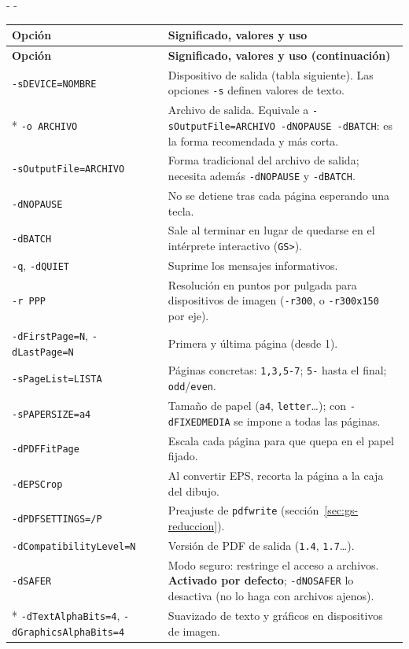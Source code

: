 \documentclass[11pt,a4paper]{article}
\makeatletter
\newcommand{\necesitaespacio}[1]{\par\penalty-100\begingroup
	\setlength{\dimen@}{#1}\dimen@ii\pagegoal\advance\dimen@ii-\pagetotal
	\ifdim\dimen@>\dimen@ii\ifdim\dimen@ii>\z@\vfil\fi\penalty-\@M\fi\endgroup}
\newenvironment{opciones}[1][Opción]{%
	\par\begingroup\small
	\begin{longtable}{L{4.25cm}L{11.2cm}}
		\toprule\rowcolor{tablacab}\cab{#1} & \cab{Significado, valores y uso} \\ \midrule
		\endfirsthead
		\toprule\rowcolor{tablacab}\cab{#1} & \cab{Significado, valores y uso (continuación)} \\ \midrule
		\endhead
		\bottomrule
		\endfoot}
	{\end{longtable}\endgroup}
\newcommand{\opt}[1]{\texttt{\textcolor{colopt}{#1}}}      %
\newcommand{\val}[1]{\texttt{#1}}                          %
\newcommand{\cab}[1]{\textbf{#1}}
\makeatother
\begin{document}
	\necesitaespacio{10\baselineskip}
	\begin{opciones}
		\opt{-sDEVICE=\allowbreak{}NOMBRE} & Dispositivo de salida (tabla siguiente). Las opciones \opt{-s} definen valores de texto.\\*
		\opt{-o ARCHIVO} & Archivo de salida. Equivale a \opt{-sOutputFile=\allowbreak{}ARCHIVO -dNOPAUSE -dBATCH}: es la forma recomendada y más corta.\\
		\opt{-sOutputFile=\allowbreak{}ARCHIVO} & Forma tradicional del archivo de salida; necesita además \opt{-dNOPAUSE} y \opt{-dBATCH}.\\
		\opt{-dNOPAUSE} & No se detiene tras cada página esperando una tecla.\\
		\opt{-dBATCH} & Sale al terminar en lugar de quedarse en el intérprete interactivo (\texttt{GS>}).\\
		\opt{-q}, \opt{-dQUIET} & Suprime los mensajes informativos.\\
		\opt{-r PPP} & Resolución en puntos por pulgada para dispositivos de imagen (\opt{-r300}, o \opt{-r300x150} por eje).\\
		\opt{-dFirstPage=N}, \opt{-dLastPage=N} & Primera y última página (desde 1).\\
		\opt{-sPageList=\allowbreak{}LISTA} & Páginas concretas: \val{1,3,5-7}; \val{5-} hasta el final; \val{odd}/\val{even}.\\
		\opt{-sPAPERSIZE=a4} & Tamaño de papel (\val{a4}, \val{letter}\ldots); con \opt{-dFIXEDMEDIA} se impone a todas las páginas.\\
		\opt{-dPDFFitPage} & Escala cada página para que quepa en el papel fijado.\\
		\opt{-dEPSCrop} & Al convertir EPS, recorta la página a la caja del dibujo.\\
		\opt{-dPDFSETTINGS=\allowbreak{}/\allowbreak{}P} & Preajuste de \texttt{pdfwrite} (sección~\ref{sec:gs-reduccion}).\\
		\opt{-dCompatibilityLevel=\allowbreak{}N} & Versión de PDF de salida (\val{1.4}, \val{1.7}\ldots).\\
		\opt{-dSAFER} & Modo seguro: restringe el acceso a archivos. \textbf{Activado por defecto}; \opt{-dNOSAFER} lo desactiva (no lo haga con archivos ajenos).\\*
		\opt{-dTextAlphaBits=\allowbreak{}4}, \opt{-dGraphicsAlphaBits=\allowbreak{}4} & Suavizado de texto y gráficos en dispositivos de imagen.\\
	\end{opciones}
	
\end{document}
